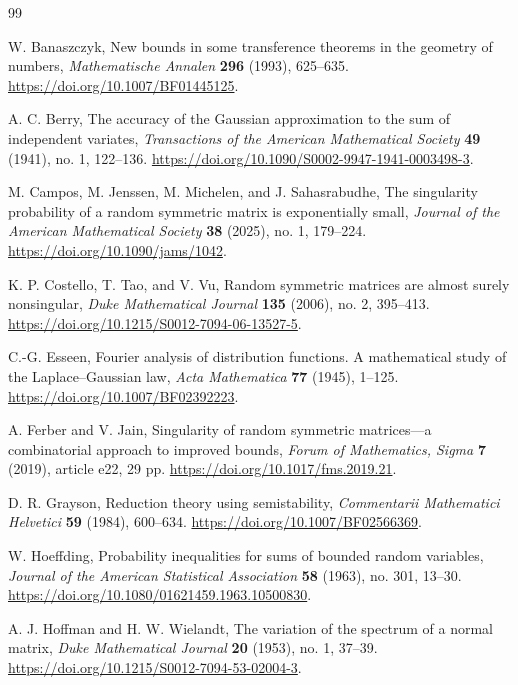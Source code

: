 \begin{thebibliography}{99}

W. Banaszczyk,
New bounds in some transference theorems in the geometry of numbers,
\emph{Mathematische Annalen} \textbf{296} (1993), 625--635.
\url{https://doi.org/10.1007/BF01445125}.

A. C. Berry,
The accuracy of the Gaussian approximation to the sum of independent variates,
\emph{Transactions of the American Mathematical Society} \textbf{49}
(1941), no. 1, 122--136.
\url{https://doi.org/10.1090/S0002-9947-1941-0003498-3}.

M. Campos, M. Jenssen, M. Michelen, and J. Sahasrabudhe,
The singularity probability of a random symmetric matrix is exponentially small,
\emph{Journal of the American Mathematical Society} \textbf{38} (2025),
no. 1, 179--224.
\url{https://doi.org/10.1090/jams/1042}.

K. P. Costello, T. Tao, and V. Vu,
Random symmetric matrices are almost surely nonsingular,
\emph{Duke Mathematical Journal} \textbf{135} (2006), no. 2, 395--413.
\url{https://doi.org/10.1215/S0012-7094-06-13527-5}.

C.-G. Esseen,
Fourier analysis of distribution functions. A mathematical study of the
Laplace--Gaussian law,
\emph{Acta Mathematica} \textbf{77} (1945), 1--125.
\url{https://doi.org/10.1007/BF02392223}.

A. Ferber and V. Jain,
Singularity of random symmetric matrices---a combinatorial approach to improved bounds,
\emph{Forum of Mathematics, Sigma} \textbf{7} (2019), article e22, 29 pp.
\url{https://doi.org/10.1017/fms.2019.21}.

D. R. Grayson,
Reduction theory using semistability,
\emph{Commentarii Mathematici Helvetici} \textbf{59} (1984), 600--634.
\url{https://doi.org/10.1007/BF02566369}.

W. Hoeffding,
Probability inequalities for sums of bounded random variables,
\emph{Journal of the American Statistical Association} \textbf{58}
(1963), no. 301, 13--30.
\url{https://doi.org/10.1080/01621459.1963.10500830}.

A. J. Hoffman and H. W. Wielandt,
The variation of the spectrum of a normal matrix,
\emph{Duke Mathematical Journal} \textbf{20} (1953), no. 1, 37--39.
\url{https://doi.org/10.1215/S0012-7094-53-02004-3}.


\end{thebibliography}
